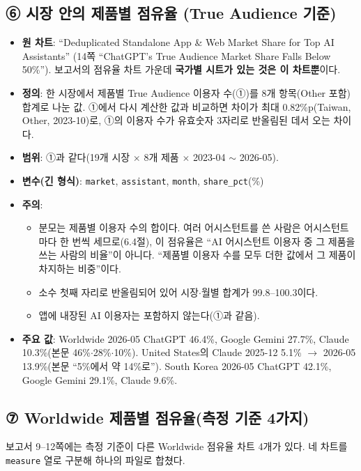 \documentclass[11pt]{article}
\begin{document}
\subsection{⑥ 시장 안의 제품별 점유율 (True Audience 기준)}

\begin{itemize}
  \item \textbf{원 차트}: ``Deduplicated Standalone App \& Web Market Share for Top AI Assistants'' (14쪽 ``ChatGPT's True Audience Market Share Falls Below 50\%''). 보고서의 점유율 차트 가운데 \textbf{국가별 시트가 있는 것은 이 차트뿐}이다.
  \item \textbf{정의}: 한 시장에서 제품별 True Audience 이용자 수(①)를 8개 항목(Other 포함) 합계로 나눈 값. ①에서 다시 계산한 값과 비교하면 차이가 최대 0.82\%p(Taiwan, Other, 2023-10)로, ①의 이용자 수가 유효숫자 3자리로 반올림된 데서 오는 차이다.
  \item \textbf{범위}: ①과 같다(19개 시장 $\times$ 8개 제품 $\times$ 2023-04 $\sim$ 2026-05).
  \item \textbf{변수(긴 형식)}: \texttt{market}, \texttt{assistant}, \texttt{month}, \texttt{share\_pct}(\%)
  \item \textbf{주의}:
  \begin{itemize}
    \item 분모는 제품별 이용자 수의 합이다. 여러 어시스턴트를 쓴 사람은 어시스턴트마다 한 번씩 세므로(6.4절), 이 점유율은 ``AI 어시스턴트 이용자 중 그 제품을 쓰는 사람의 비율''이 아니다. ``제품별 이용자 수를 모두 더한 값에서 그 제품이 차지하는 비중''이다.
    \item 소수 첫째 자리로 반올림되어 있어 시장$\cdot$월별 합계가 99.8--100.3이다.
    \item 앱에 내장된 AI 이용자는 포함하지 않는다(①과 같음).
  \end{itemize}
  \item \textbf{주요 값}: Worldwide 2026-05 ChatGPT 46.4\%, Google Gemini 27.7\%, Claude 10.3\%(본문 46\%$\cdot$28\%$\cdot$10\%). United States의 Claude 2025-12 5.1\% $\to$ 2026-05 13.9\%(본문 ``5\%에서 약 14\%로''). South Korea 2026-05 ChatGPT 42.1\%, Google Gemini 29.1\%, Claude 9.6\%.
\end{itemize}

\subsection{⑦ Worldwide 제품별 점유율(측정 기준 4가지)}

보고서 9--12쪽에는 측정 기준이 다른 Worldwide 점유율 차트 4개가 있다. 네 차트를 \texttt{measure} 열로 구분해 하나의 파일로 합쳤다.
\end{document}
